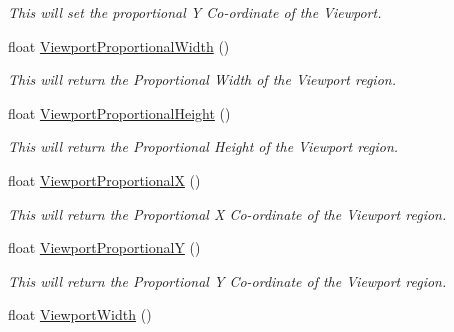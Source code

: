 \begin{DoxyCompactItemize}
\begin{DoxyCompactList}\small\item\em This will set the proportional Y Co-\/ordinate of the Viewport. \end{DoxyCompactList}\item 
\hypertarget{classc_viewport_control_ae13f217fcb42d5b9ece03d5d3bd63097}{
float \hyperlink{classc_viewport_control_ae13f217fcb42d5b9ece03d5d3bd63097}{ViewportProportionalWidth} ()}
\label{classc_viewport_control_ae13f217fcb42d5b9ece03d5d3bd63097}

\begin{DoxyCompactList}\small\item\em This will return the Proportional Width of the Viewport region. \end{DoxyCompactList}\item 
\hypertarget{classc_viewport_control_abfe6b390bad6fdcbb971c5a4fc8edd62}{
float \hyperlink{classc_viewport_control_abfe6b390bad6fdcbb971c5a4fc8edd62}{ViewportProportionalHeight} ()}
\label{classc_viewport_control_abfe6b390bad6fdcbb971c5a4fc8edd62}

\begin{DoxyCompactList}\small\item\em This will return the Proportional Height of the Viewport region. \end{DoxyCompactList}\item 
\hypertarget{classc_viewport_control_a7ab015e6c7190e3793b5eaf0dd4404b9}{
float \hyperlink{classc_viewport_control_a7ab015e6c7190e3793b5eaf0dd4404b9}{ViewportProportionalX} ()}
\label{classc_viewport_control_a7ab015e6c7190e3793b5eaf0dd4404b9}

\begin{DoxyCompactList}\small\item\em This will return the Proportional X Co-\/ordinate of the Viewport region. \end{DoxyCompactList}\item 
\hypertarget{classc_viewport_control_ae6a335d09694bb5821ba2ff6e0fce3ef}{
float \hyperlink{classc_viewport_control_ae6a335d09694bb5821ba2ff6e0fce3ef}{ViewportProportionalY} ()}
\label{classc_viewport_control_ae6a335d09694bb5821ba2ff6e0fce3ef}

\begin{DoxyCompactList}\small\item\em This will return the Proportional Y Co-\/ordinate of the Viewport region. \end{DoxyCompactList}\item 
\hypertarget{classc_viewport_control_a00ff003dc0465d09e5f829926b5c72bd}{
float \hyperlink{classc_viewport_control_a00ff003dc0465d09e5f829926b5c72bd}{ViewportWidth} ()}
\label{classc_viewport_control_a00ff003dc0465d09e5f829926b5c72bd}


\end{DoxyCompactItemize}
